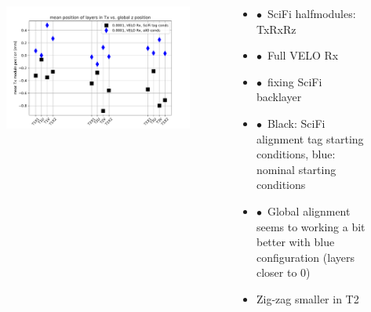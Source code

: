 \documentclass[aspectratio=1610, 12pt]{beamer}
\begin{document}
\begin{frame}
  \begin{columns}
    \begin{column}[c]{0.5\textwidth}
      \begin{figure}
        \includegraphics[width=\textwidth]{plots/03-19/all_runs_iD_glob_z_vs_local_Tx.pdf}
      \end{figure}
    \end{column}
    \begin{column}[c]{0.5\textwidth}
      \begin{itemize}
        \item $\bullet$\, SciFi halfmodules: TxRxRz
        \item $\bullet$\, Full VELO Rx
        \item $\bullet$\, fixing SciFi backlayer
        \item $\bullet$\, Black: SciFi alignment tag starting conditions, blue: nominal starting conditions
        \item $\bullet$\, Global alignment seems to working a bit better with blue configuration (\to layers closer to 0)
        \item \to Zig-zag smaller in T2
      \end{itemize}
    \end{column}
  \end{columns}
\end{frame}
\end{document}
